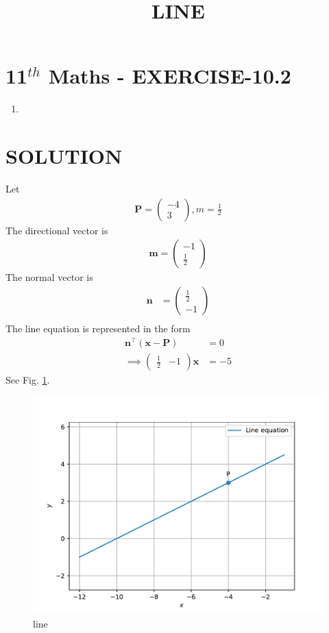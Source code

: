 \documentclass[12pt]{article}
\providecommand{\brak}[1]{\ensuremath{\left(#1\right)}}
\newcommand{\myvec}[1]{\ensuremath{\begin{pmatrix}#1\end{pmatrix}}}
\let\vec\mathbf
\begin{document}
\begin{center}
\title{\textbf{LINE}}
\date{\vspace{-5ex}} %
\maketitle
\end{center}

\section{11$^{th}$ Maths - EXERCISE-10.2}
\begin{enumerate}
\item 
\end{enumerate}
\section{SOLUTION}
\fi
Let
\begin{align}
\vec{P}=\myvec{-4\\ 3},
m=\frac{1}{2}
\end{align}
The directional vector is
\begin{align}
\vec{m}=\myvec{-1\\ \frac{1}{2}}
\end{align}
The normal vector is
\begin{align}
\vec{n}&=\myvec{\frac{1}{2}\\ -1}\\
\end{align}
The line equation is represented in the form 
\begin{align}
\vec{n}^\top \brak{\vec{x}-\vec{P}}&= 0 \\
\implies \myvec{\frac{1}{2}&-1}{\vec{x}}&=-5
\end{align}
See Fig. 
		\ref{fig:chapters/11/10/2/2/Figure}.
\begin{figure}[h]
\centering
\includegraphics[width=\columnwidth]{chapters/11/10/2/2/figs/fig.pdf}
\caption{line}
		\label{fig:chapters/11/10/2/2/Figure}
\end{figure}
\end{document}
